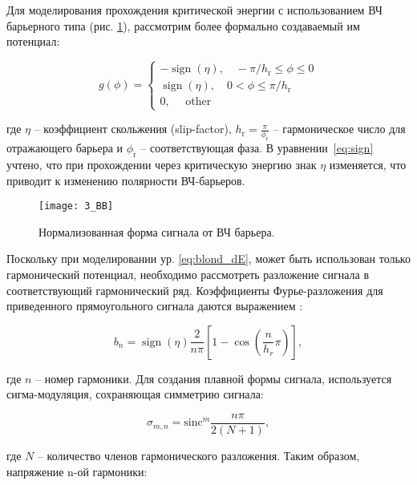 \par Для моделирования прохождения критической энергии с использованием ВЧ барьерного типа (рис. \ref{fig:rf}), рассмотрим более формально создаваемый им потенциал:

\begin{equation}
g(\phi)=\left\{\begin{array}{c}
-\operatorname{sign}(\eta),\quad -\pi / h_{\textrm{r}} \leq \phi \leq 0 \\
\operatorname{sign}(\eta),\quad 0<\phi \leq \pi / h_{\textrm{r}} \\
0, \quad \text { other }
\end{array}\right.
\label{eq:sign}
\end{equation}

\noindent где $\eta$ – коэффициент скольжения (slip-factor), $h_{\textrm{r}}=\frac{\pi}{\phi_{\textrm{r}}}$ – гармоническое число для отражающего барьера и $\phi_{\textrm{r}}$ – соответствующая фаза.  В уравнении~\ref{eq:sign} учтено, что при прохождении через критическую энергию знак $\eta$ изменяется, что приводит к изменению полярности ВЧ-барьеров.

\begin{figure}[!h]
  \centering
   \texttt{[image: 3\_BB]}
   \caption{Нормализованная форма сигнала от ВЧ барьера.}
   \label{fig:rf}
\end{figure}

\par Поскольку при моделировании ур. \ref{eq:blond_dE}, может быть использован только гармонический потенциал, необходимо рассмотреть разложение сигнала в соответствующий гармонический ряд. Коэффициенты Фурье-разложения для приведенного прямоугольного сигнала даются выражением \cite{cern:bb}:

\begin{equation}
b_n=\operatorname{sign}{\left(\eta\right)}\frac{2}{n\pi}\left[1-\cos{\left(\frac{n}{h_r}\pi\right)}\right],
\label{b}
\end{equation}

\noindent где $n$ – номер гармоники. Для создания плавной формы сигнала, используется сигма-модуляция, сохраняющая симметрию сигнала:

\begin{equation}
\sigma_{m, n}={\text{sinc}}^m{\frac{n\pi}{2\left(N+1\right)}},
\label{sigma}
\end{equation}

\noindent где $N$ – количество членов гармонического разложения. Таким образом, напряжение n-ой гармоники:

